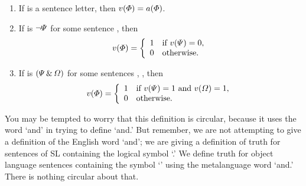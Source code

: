 \begin{enumerate}
\item If \metaA{} is a sentence letter, then $v(\varPhi{})=a(\varPhi{})$.


\item If \metaA{} is ${\neg}\varPsi{}$ for some sentence \metaB{}, then
\begin{displaymath}v(\varPhi{}) =
	\left\{\begin{array}{ll}
	1 & \mbox{if $v(\varPsi{}) = 0$},\\
	0 & \mbox{otherwise.}
	\end{array}\right.
\end{displaymath}

\item If \metaA{} is $(\varPsi{}\,\&\,\varOmega{})$ for some sentences \metaB{}, \metaC{}, then
\begin{displaymath}v(\varPhi{}) =
	\left\{\begin{array}{ll}
	1 & \mbox{if $v(\varPsi{}) = 1$ and $v(\varOmega{}) = 1$,}\\
	0 & \mbox{otherwise.}
	\end{array}\right.
\end{displaymath}
\end{enumerate}
\label{truthdefinition}
You may be tempted to worry that this definition is circular, because it uses the word `and' in trying to define `and.' But remember, we are not attempting to give a definition of the English word `and'; we are giving a definition of truth for sentences of SL containing the logical symbol `\eand.' We define truth for object language sentences containing the symbol `\eand' using the metalanguage word `and.' There is nothing circular about that.

